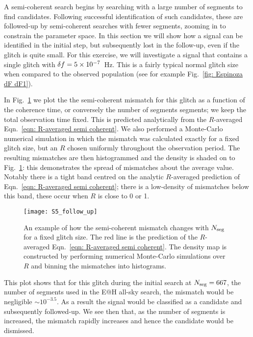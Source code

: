 \documentclass[../full_thesis/full_thesis.tex]{subfiles}
\begin{document}
A semi-coherent search begins by searching with a large number of segments to
find candidates. Following successful identification of such candidates, these
are followed-up by semi-coherent searches with fewer segments, zooming in to
constrain the parameter space. In this section we will show how a signal can
be identified in the initial step, but subsequently lost in the follow-up, even
if the glitch is quite small. For this exercise, we will investigate a signal
that contains a single glitch with $\delta f=5\times10^{-7}$~Hz. This is a
fairly typical normal glitch size when compared to the observed population (see for
example Fig.~\ref{fig: Espinoza dF dF1}).

In Fig.~\ref{fig: follow-up} we plot the the semi-coherent mismatch for this
glitch as a function of the coherence time, or conversely the number of
segments segments; we keep the total observation time fixed. This is predicted
analytically from the $R$-averaged Eqn.~\eqref{eqn: R-averaged semi coherent}.
We also performed a Monte-Carlo numerical simulation in which the mismatch was
calculated exactly for a fixed glitch size, but an $R$ chosen uniformly
throughout the observation period. The resulting mismatches are then histogrammed and the
density is shaded on to Fig.~\ref{fig: follow-up}: this demonstrates the spread of
mismatches about the average value. Notably there is a tight band centred on
the analytic $R$-averaged prediction of Eqn.~\eqref{eqn: R-averaged semi coherent};
there is a low-density of mismatches below this band, these occur when $R$ is
close to 0 or 1.

\begin{figure}[htb]
\centering
\texttt{[image: S5\_follow\_up]}
\caption{An example of how the semi-coherent mismatch changes with $N_{\textrm{seg}}$ for
         a fixed glitch size. The red line is the prediction of the $R$-averaged
         Eqn.~\eqref{eqn: R-averaged semi coherent}. The density map is constructed
         by performing numerical Monte-Carlo simulations over $R$ and binning the mismatches
         into histograms.}
\label{fig: follow-up}
\end{figure}
This plot shows that for this glitch during the initial search at $N_{\textrm{seg}}=667$,
the number of segments used in the E@H all-sky search, the mismatch would be
negligible $\sim10^{-3.5}$. As a result the signal would be classified as a
candidate and subsequently followed-up. We see then that, as the number of
segments is increased, the mismatch rapidly increases and hence the candidate
would be dismissed.
\end{document}
